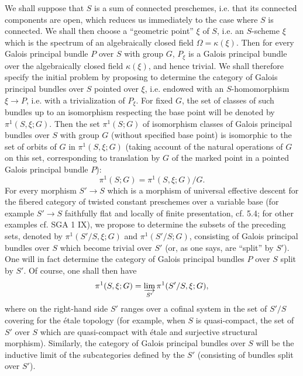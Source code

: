We shall suppose that $S$ is a sum of connected preschemes, i.e. that its connected components are open, which reduces us immediately to the case where $S$ is connected. We shall then choose a ``geometric point'' $\xi$ of $S$, i.e. an $S$-scheme $\xi$ which is the spectrum of an algebraically closed field $\Omega=\kappa(\xi)$. Then for every Galois principal bundle $P$ over $S$ with group $G$, $P_\xi$ is a Galois principal bundle over the algebraically closed field $\kappa(\xi)$, and hence trivial. We shall therefore specify the initial problem by proposing to determine the category of Galois principal bundles over $S$ pointed over $\xi$, i.e. endowed with an $S$-homomorphism $\xi\to P$, i.e. with a trivialization of $P_\xi$. For fixed $G$, the set of classes of such bundles up to an isomorphism respecting the base point will be denoted by $\pi^1(S,\xi;G)$. Then the set $\pi^1(S;G)$ of isomorphism classes of Galois principal bundles over $S$ with group $G$ (without specified base point) is isomorphic to the set of orbits of $G$ in $\pi^1(S,\xi;G)$ (taking account of the natural operations of $G$ on this set, corresponding to translation by $G$ of the marked point in a pointed Galois principal bundle $P$):
\[
\pi^1(S;G)=\pi^1(S,\xi;G)/G.
\]
For every morphism $S'\to S$ which is a morphism of universal effective descent for the fibered category of twisted constant preschemes over a variable base (for example $S'\to S$ faithfully flat and locally of finite presentation, cf. 5.4; for other examples cf. SGA 1 IX), we propose to determine the subsets of the preceding sets, denoted by $\pi^1(S'/S,\xi;G)$ and $\pi^1(S'/S;G)$, consisting of Galois principal bundles over $S$ which become trivial over $S'$ (or, as one says, are ``split'' by $S'$). One will in fact determine the category of Galois principal bundles $P$ over $S$ split by $S'$. Of course, one shall then have
\[
\pi^1(S,\xi;G)=\varinjlim_{S'}\pi^1(S'/S,\xi;G),
\]
where on the right-hand side $S'$ ranges over a cofinal system in the set of $S'/S$ covering for the étale topology (for example, when $S$ is quasi-compact, the set of $S'$ over $S$ which are quasi-compact with étale and surjective structural morphism). Similarly, the category of Galois principal bundles over $S$ will be the inductive limit of the subcategories defined by the $S'$ (consisting of bundles split over $S'$).

